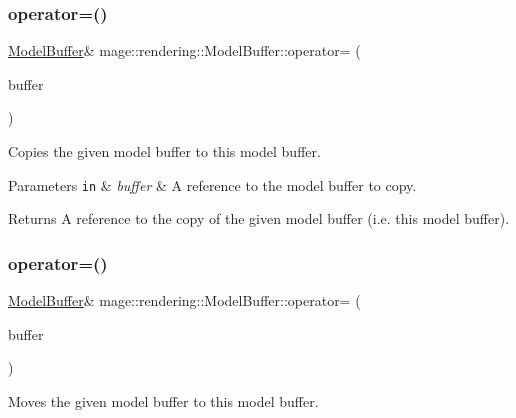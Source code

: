 \subsubsection{\texorpdfstring{operator=()}{operator=()}\hspace{0.1cm}{\footnotesize\ttfamily [1/2]}}
{\footnotesize\ttfamily \hyperlink{structmage_1_1rendering_1_1_model_buffer}{Model\+Buffer}\& mage\+::rendering\+::\+Model\+Buffer\+::operator= (\begin{DoxyParamCaption}\item[{const \hyperlink{structmage_1_1rendering_1_1_model_buffer}{Model\+Buffer} \&}]{buffer }\end{DoxyParamCaption})\hspace{0.3cm}{\ttfamily [default]}}

Copies the given model buffer to this model buffer.


\begin{DoxyParams}[1]{Parameters}
\mbox{\tt in}  & {\em buffer} & A reference to the model buffer to copy. \\
\hline
\end{DoxyParams}
\begin{DoxyReturn}{Returns}
A reference to the copy of the given model buffer (i.\+e. this model buffer). 
\end{DoxyReturn}
\hypertarget{structmage_1_1rendering_1_1_model_buffer_a083377a5af4c7b14c2db8659824789ff}{}\label{structmage_1_1rendering_1_1_model_buffer_a083377a5af4c7b14c2db8659824789ff} 
\subsubsection{\texorpdfstring{operator=()}{operator=()}\hspace{0.1cm}{\footnotesize\ttfamily [2/2]}}
{\footnotesize\ttfamily \hyperlink{structmage_1_1rendering_1_1_model_buffer}{Model\+Buffer}\& mage\+::rendering\+::\+Model\+Buffer\+::operator= (\begin{DoxyParamCaption}\item[{\hyperlink{structmage_1_1rendering_1_1_model_buffer}{Model\+Buffer} \&\&}]{buffer }\end{DoxyParamCaption})\hspace{0.3cm}{\ttfamily [default]}}

Moves the given model buffer to this model buffer.


